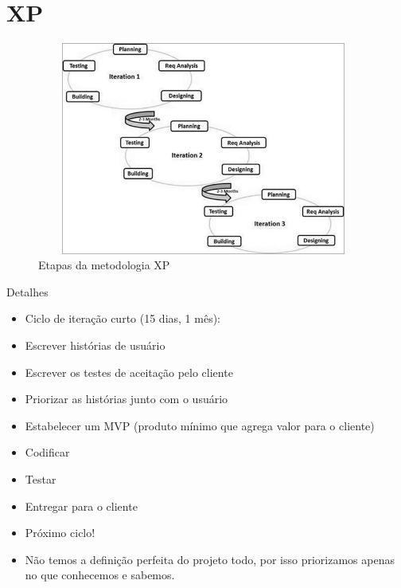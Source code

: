 \section{XP}

\begin{frame}
\begin{block}{}
	 \begin{figure}[!htb]
			\centering	  				
			\includegraphics[height=7cm, width = 11cm]{./pic/sdlc_agile_model.jpg}
			\caption{Etapas da metodologia XP \cite{TUTORIALSPOINT}}
			\label{fig_cascata}
		\end{figure}
\end{block}
\end{frame}


\begin{frame}
\begin{block}{Detalhes}
	 \begin{itemize}
			\item Ciclo de iteração curto (15 dias, 1 mês):

			\item Escrever histórias de usuário
			
			\item Escrever os testes de aceitação pelo cliente
			
			\item Priorizar as histórias junto com o usuário
			
			\item Estabelecer um MVP (produto mínimo que agrega valor para o cliente)
			
			\item Codificar
			
			\item Testar
			
			\item Entregar para o cliente
			
			\item Próximo ciclo!
			
			\item Não temos a definição perfeita do projeto todo, por isso priorizamos apenas no que conhecemos e sabemos.

	 \end{itemize}
\end{block}
\end{frame}

